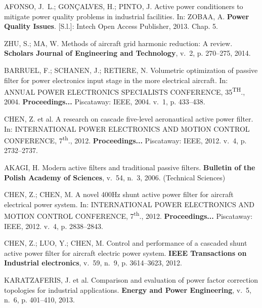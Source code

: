 \begin{thebibliography}{}
{AFONSO, J.~L.; GON{\c{C}}ALVES, H.; PINTO, J. Active power conditioners to
	 mitigate power quality problems in industrial facilities.
	 In: ZOBAA, A. \textbf{Power Quality Issues}.
     [S.l.]: Intech Open Access Publisher, 2013. Chap. 5.}

{ZHU, S.; MA, W. Methods of aircraft grid harmonic reduction: A review.
\textbf{Scholars Journal of Engineering and Technology}, v.~2, p.
  270--275, 2014.}

{BARRUEL, F.; SCHANEN, J.; RETIERE, N. Volumetric optimization of passive
  filter for power electronics input stage in the more electrical aircraft. In:
  \uppercase{Annual Power Electronics Specialists Conference, 35\textsuperscript{\lowercase{th}}., 2004.}
  \textbf{Proceedings...} Piscataway: IEEE, 2004. v.~1, p. 433--438.}

{CHEN, Z. et al. A research on cascade five-level aeronautical active power
  filter. In: \uppercase{International Power Electronics and Motion
  Control Conference,} 7\textsuperscript{th}., 2012. \textbf{Proceedings...} Piscataway: IEEE, 2012. v.~4, p. 2732--2737.}

{AKAGI, H. Modern active filters and traditional passive filters.
\textbf{Bulletin of the Polish Academy of Sciences}, v.~54,
  n.~3, 2006. (Technical Sciences)}

{CHEN, Z.; CHEN, M. A novel 400Hz shunt active power filter for aircraft
  electrical power system. In: \uppercase{International Power Electronics and Motion
  	Control Conference,} 7\textsuperscript{th}., 2012. \textbf{Proceedings...} Piscataway: IEEE, 2012. v.~4, p.
  2838--2843.}

{CHEN, Z.; LUO, Y.; CHEN, M. Control and performance of a cascaded shunt active
  power filter for aircraft electric power system.
\textbf{IEEE Transactions on Industrial electronics}, v.~59, n.~9, p.
  3614--3623, 2012.}

{KARATZAFERIS, J. et al. Comparison and evaluation of power factor correction
  topologies for industrial applications.
\textbf{Energy and Power Engineering}, v.~5, n.~6, p. 401--410, 2013.}


\end{thebibliography}
